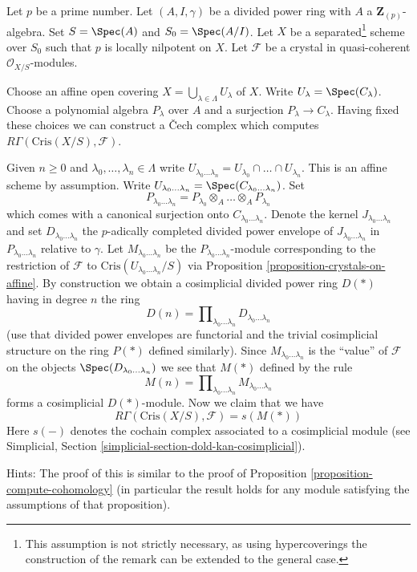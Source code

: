 \begin{remark}
\label{remark-cech-complex}
Let $p$ be a prime number. Let $(A, I, \gamma)$ be a divided power
ring with $A$ a $\mathbf{Z}_{(p)}$-algebra. Set $S = \Spec(A)$ and
$S_0 = \Spec(A/I)$. Let $X$ be a separated\footnote{This assumption is
not strictly necessary, as using hypercoverings the construction of the
remark can be extended to the general case.} scheme over
$S_0$ such that $p$ is locally nilpotent on $X$. Let $\mathcal{F}$ be a
crystal in quasi-coherent $\mathcal{O}_{X/S}$-modules.

\medskip\noindent
Choose an affine open covering
$X = \bigcup_{\lambda \in \Lambda} U_\lambda$ of $X$.
Write $U_\lambda = \Spec(C_\lambda)$. Choose a polynomial algebra
$P_\lambda$ over $A$ and a surjection $P_\lambda \to C_\lambda$.
Having fixed these choices we can construct a {\v C}ech complex which
computes $R\Gamma(\text{Cris}(X/S), \mathcal{F})$.

\medskip\noindent
Given $n \geq 0$ and $\lambda_0, \ldots, \lambda_n \in \Lambda$
write $U_{\lambda_0 \ldots \lambda_n} = U_{\lambda_0} \cap \ldots
\cap U_{\lambda_n}$. This is an affine scheme by assumption. Write
$U_{\lambda_0 \ldots \lambda_n} = \Spec(C_{\lambda_0 \ldots \lambda_n})$.
Set
$$
P_{\lambda_0 \ldots \lambda_n} =
P_{\lambda_0} \otimes_A \ldots \otimes_A P_{\lambda_n}
$$
which comes with a canonical surjection onto $C_{\lambda_0 \ldots \lambda_n}$.
Denote the kernel $J_{\lambda_0 \ldots \lambda_n}$ and set
$D_{\lambda_0 \ldots \lambda_n}$
the $p$-adically completed divided power envelope of
$J_{\lambda_0 \ldots \lambda_n}$ in $P_{\lambda_0 \ldots \lambda_n}$
relative to $\gamma$. Let $M_{\lambda_0 \ldots \lambda_n}$ be the
$P_{\lambda_0 \ldots \lambda_n}$-module corresponding
to the restriction of $\mathcal{F}$ to
$\text{Cris}(U_{\lambda_0 \ldots \lambda_n}/S)$ via
Proposition \ref{proposition-crystals-on-affine}.
By construction we obtain a cosimplicial divided power ring $D(*)$
having in degree $n$ the ring
$$
D(n) =
\prod\nolimits_{\lambda_0 \ldots \lambda_n}
D_{\lambda_0 \ldots \lambda_n}
$$
(use that divided power envelopes are functorial and the trivial
cosimplicial structure on the ring $P(*)$ defined similarly).
Since $M_{\lambda_0 \ldots \lambda_n}$ is the ``value'' of $\mathcal{F}$
on the objects $\Spec(D_{\lambda_0 \ldots \lambda_n})$ we see that
$M(*)$ defined by the rule
$$
M(n) = \prod\nolimits_{\lambda_0 \ldots \lambda_n}
M_{\lambda_0 \ldots \lambda_n}
$$
forms a cosimplicial $D(*)$-module. Now we claim that we have
$$
R\Gamma(\text{Cris}(X/S), \mathcal{F}) = s(M(*))
$$
Here $s(-)$ denotes the cochain complex associated to a cosimplicial
module (see
Simplicial, Section \ref{simplicial-section-dold-kan-cosimplicial}).

\medskip\noindent
Hints: The proof of this is similar to the proof of
Proposition \ref{proposition-compute-cohomology} (in particular
the result holds for any module satisfying the assumptions of
that proposition).
\end{remark}


